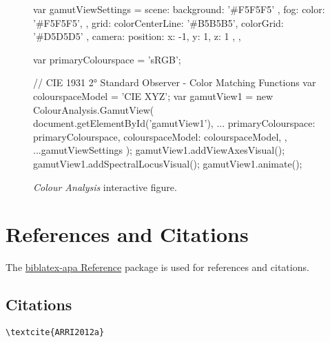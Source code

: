 \begin{figure}[H]
    \ifdefined\HCode
        \JavaScript
            var gamutViewSettings = {
                    scene: {
                        background: '#F5F5F5'
                    },
                    fog: {
                        color: '#F5F5F5',
                    },
                    grid: {
                        colorCenterLine: '#B5B5B5',
                        colorGrid: '#D5D5D5'
                    },
                    camera: {
                        position: { x: -1, y: 1, z: 1 },
                    },
            }

            var primaryColourspace = 'sRGB';

            // CIE 1931 2° Standard Observer - Color Matching Functions
            var colourspaceModel = 'CIE XYZ';
            var gamutView1 = new ColourAnalysis.GamutView(
                document.getElementById('gamutView1'),
                {
                    ...{
                        primaryColourspace: primaryColourspace,
                        colourspaceModel: colourspaceModel,
                    },
                    ...gamutViewSettings
                }
            );
            gamutView1.addViewAxesVisual();
            gamutView1.addSpectralLocusVisual();
            gamutView1.animate();
        \EndJavaScript
    \fi
    \caption{
        \textit{Colour Analysis} interactive figure.
    }
    \label{fig:colour-analysis-interactive-figure}
\end{figure}

\section*{References and Citations}
\label{sec:references-and-citations}

The \href{https://ctan.org/pkg/biblatex-apa}{biblatex-apa Reference}
package is used for references and citations.

\subsection*{Citations}
\label{subsec:citations}

\begin{lstlisting}[caption={Citation for Single Author.}]
\textcite{ARRI2012a}
\end{lstlisting}

\textcite{ARRI2012a}

